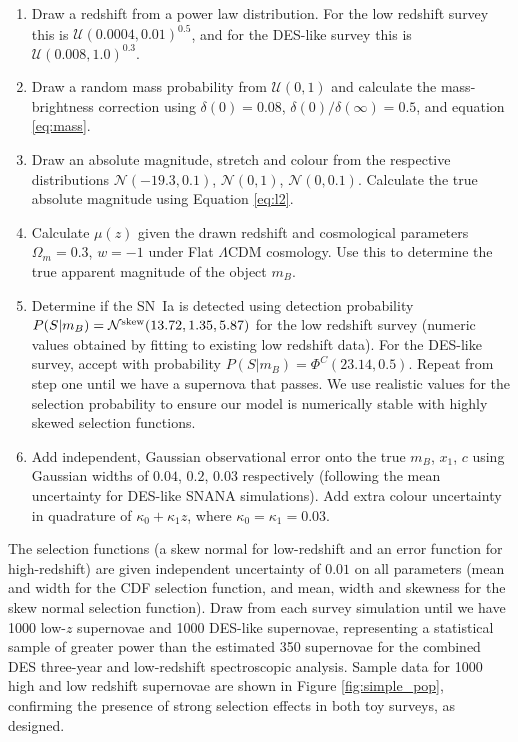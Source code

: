 \documentclass[a4paper,fleqn,usenatbib]{mnras}
\newcommand{\green}{\color{forestgreen}}
\begin{document}
\begin{enumerate}[1.]
	\item Draw a redshift from a power law distribution. For the low redshift survey this is $\mathcal{U}(0.0004, 0.01)^{0.5}$, and for the DES-like survey this is $\mathcal{U}(0.008, 1.0)^{0.3}$.
	\item Draw a random mass probability from $\mathcal{U}(0, 1)$ and calculate the mass-brightness correction using $\delta(0) = 0.08$, $\delta(0)/\delta(\infty) = 0.5$, and equation \eqref{eq:mass}.
	\item Draw an absolute magnitude, stretch and colour from the respective distributions $\mathcal{N}(-19.3, 0.1)$, $\mathcal{N}(0, 1)$, $\mathcal{N}(0, 0.1)$. {\green Calculate the true absolute magnitude using Equation \eqref{eq:l2}.}
	\item Calculate $\mu(z)$ given the drawn redshift and cosmological parameters $\Omega_m = 0.3$, $w = -1$ under Flat $\Lambda$CDM cosmology. Use this to determine the true apparent magnitude of the object $m_B$.
	\item Determine if the SN~Ia is detected using detection probability $P(S|m_B) = \mathcal{N}^{\rm skew}(13.72, 1.35, 5.87)$ for the low redshift survey (numeric values obtained by fitting to existing low redshift data). For the DES-like survey, accept with probability $P(S|m_B) = \Phi^C(23.14, 0.5)$. Repeat from step one until we have a supernova that passes. {\green We use realistic values for the selection probability to ensure our model is numerically stable with highly skewed selection functions.}
	\item Add independent, Gaussian observational error onto the true $m_B$, $x_1$, $c$ using Gaussian widths of $0.04$, $0.2$, $0.03$ respectively (following the mean uncertainty for DES-like SNANA simulations). Add extra colour uncertainty in quadrature of $\kappa_0 + \kappa_1 z$, where $\kappa_0 = \kappa_1 = 0.03$.
\end{enumerate}

The selection functions (a skew normal for low-redshift and an error function for high-redshift) are given independent uncertainty of $0.01$ on all parameters (mean and width for the CDF selection function, and mean, width and skewness for the skew normal selection function). Draw from each survey simulation until we have 1000 low-$z$ supernovae and 1000 DES-like supernovae, representing a statistical sample of greater power than the estimated 350 supernovae for the combined DES three-year and low-redshift spectroscopic analysis. Sample data for 1000 high and low redshift supernovae are shown in Figure \ref{fig:simple_pop}, confirming the presence of strong selection effects in both toy surveys, as designed. 
\end{document}
